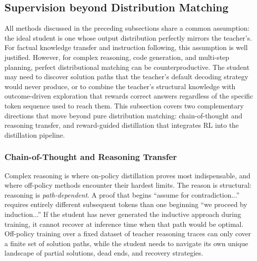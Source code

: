 \documentclass{article} %
\begin{document}
\subsection{Supervision beyond Distribution Matching}
\label{subsec:beyond_matching}

All methods discussed in the preceding subsections share a common assumption: the ideal student is one whose output distribution perfectly mirrors the teacher's. For factual knowledge transfer and instruction following, this assumption is well justified. However, for complex reasoning, code generation, and multi-step planning, perfect distributional matching can be counterproductive. The student may need to discover solution paths that the teacher's default decoding strategy would never produce, or to combine the teacher's structural knowledge with outcome-driven exploration that rewards correct answers regardless of the specific token sequence used to reach them. This subsection covers two complementary directions that move beyond pure distribution matching: chain-of-thought and reasoning transfer, and reward-guided distillation that integrates RL into the distillation pipeline.

\subsubsection{Chain-of-Thought and Reasoning Transfer}

Complex reasoning is where on-policy distillation proves most indispensable, and where off-policy methods encounter their hardest limits. The reason is structural: reasoning is \emph{path-dependent}. A proof that begins ``assume for contradiction...'' requires entirely different subsequent tokens than one beginning ``we proceed by induction...'' If the student has never generated the inductive approach during training, it cannot recover at inference time when that path would be optimal. Off-policy training over a fixed dataset of teacher reasoning traces can only cover a finite set of solution paths, while the student needs to navigate its own unique landscape of partial solutions, dead ends, and recovery strategies.
\end{document}
